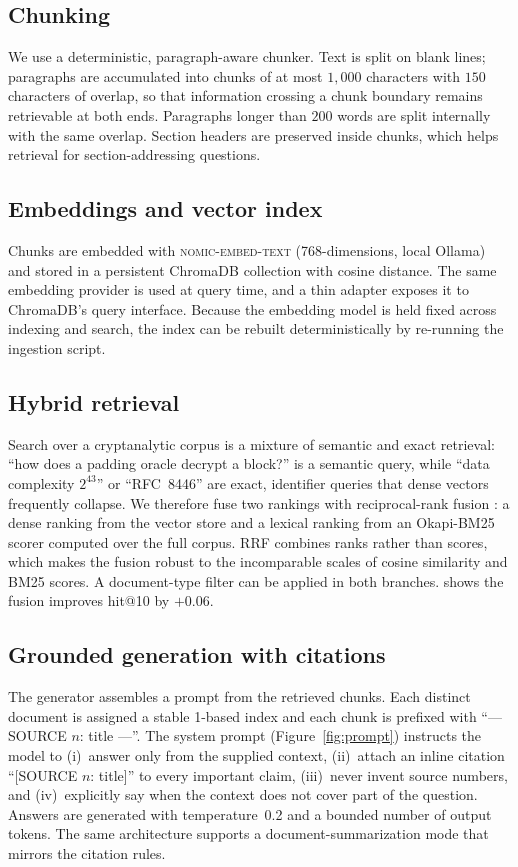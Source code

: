 \documentclass[version=submission]{iacrcc}
\begin{document}
\subsection{Chunking}
We use a deterministic, paragraph-aware chunker. Text is split on blank lines;
paragraphs are accumulated into chunks of at most $1{,}000$ characters with
$150$ characters of overlap, so that information crossing a chunk boundary
remains retrievable at both ends. Paragraphs longer than $200$ words are split
internally with the same overlap. Section headers are preserved inside chunks,
which helps retrieval for section-addressing questions.

\subsection{Embeddings and vector index}
Chunks are embedded with \textsc{nomic-embed-text} (768-dimensions, local
Ollama) and stored in a persistent ChromaDB \cite{chromadb} collection with
cosine distance. The same embedding provider is used at query time, and a thin
adapter exposes it to ChromaDB's query interface. Because the embedding model
is held fixed across indexing and search, the index can be rebuilt
deterministically by re-running the ingestion script.

\subsection{Hybrid retrieval}
Search over a cryptanalytic corpus is a mixture of semantic and exact
retrieval: ``how does a padding oracle decrypt a block?'' is a semantic query,
while ``data complexity $2^{43}$'' or ``RFC~8446'' are exact, identifier
queries that dense vectors frequently collapse. We therefore fuse two
rankings with reciprocal-rank fusion \cite{cormack2009rrf}: a dense ranking
from the vector store and a lexical ranking from an Okapi-BM25
\cite{robertson2009bm25} scorer computed over the full corpus. RRF combines
ranks rather than scores, which makes the fusion robust to the incomparable
scales of cosine similarity and BM25 scores. A document-type filter can be
applied in both branches.  shows the fusion improves hit@10 by
$+0.06$.

\subsection{Grounded generation with citations}
The generator assembles a prompt from the retrieved chunks. Each distinct
document is assigned a stable 1-based index and each chunk is prefixed with
``--- SOURCE $n$: title ---''. The system prompt (Figure~\ref{fig:prompt})
instructs the model to (i)~answer only from the supplied context, (ii)~attach
an inline citation ``[SOURCE $n$: title]'' to every important claim,
(iii)~never invent source numbers, and (iv)~explicitly say when the context
does not cover part of the question. Answers are generated with
temperature~0.2 and a bounded number of output tokens. The same architecture
supports a document-summarization mode that mirrors the citation rules.
\end{document}
